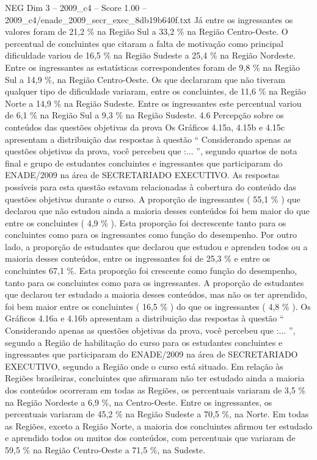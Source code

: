 \begin{textsample}{NEG Dim 3 – 2009\_c4 – Score 1.00 – 2009\_c4/enade\_2009\_secr\_exec\_8db19b640f.txt}
Já entre os ingressantes os valores foram de 21,2 \% na Região Sul a 33,2 \% na Região Centro-Oeste.
O percentual de concluintes que citaram a falta de motivação como principal dificuldade variou de 16,5 \% na Região Sudeste a 25,4 \% na Região Nordeste.
Entre os ingressantes as estatísticas correspondentes foram de 9,8 \% na Região Sul a 14,9 \%, na Região Centro-Oeste.
Os que declararam que não tiveram qualquer tipo de dificuldade variaram, entre os concluintes, de 11,6 \% na Região Norte a 14,9 \% na Região Sudeste.
Entre os ingressantes este percentual variou de 6,1 \% na Região Sul a 9,3 \% na Região Sudeste. 4.6 Percepção sobre os conteúdos das questões objetivas da prova Os Gráficos 4.15a, 4.15b e 4.15c apresentam a distribuição das respostas à questão “ Considerando apenas as questões objetivas da prova, você percebeu que :... ”, segundo quartos de nota final e grupo de estudantes concluintes e ingressantes que participaram do ENADE/2009 na área de SECRETARIADO EXECUTIVO.
As respostas possíveis para esta questão estavam relacionadas à cobertura do conteúdo das questões objetivas durante o curso.
A proporção de ingressantes ( 55,1 \% ) que declarou que não estudou ainda a maioria desses conteúdos foi bem maior do que entre os concluintes ( 4,9 \% ).
Esta proporção foi decrescente tanto para os concluintes como para os ingressantes como função do desempenho.
Por outro lado, a proporção de estudantes que declarou que estudou e aprendeu todos ou a maioria desses conteúdos, entre os ingressantes foi de 25,3 \% e entre os concluintes 67,1 \%.
Esta proporção foi crescente como função do desempenho, tanto para os concluintes como para os ingressantes.
A proporção de estudantes que declarou ter estudado a maioria desses conteúdos, mas não os ter aprendido, foi bem maior entre os concluintes ( 16,5 \% ) do que os ingressantes ( 4,8 \% ).
Os Gráficos 4.16a e 4.16b apresentam a distribuição das respostas à questão “ Considerando apenas as questões objetivas da prova, você percebeu que :... ”, segundo a Região de habilitação do curso para os estudantes concluintes e ingressantes que participaram do ENADE/2009 na área de SECRETARIADO EXECUTIVO, segundo a Região onde o curso está situado.
Em relação às Regiões brasileiras, concluintes que afirmaram não ter estudado ainda a maioria dos conteúdos ocorreram em todas as Regiões, os percentuais variaram de 3,5 \% na Região Nordeste a 6,9 \%, na Centro-Oeste.
Entre os ingressantes, os percentuais variaram de 45,2 \% na Região Sudeste a 70,5 \%, na Norte.
Em todas as Regiões, exceto a Região Norte, a maioria dos concluintes afirmou ter estudado e aprendido todos ou muitos dos conteúdos, com percentuais que variaram de 59,5 \% na Região Centro-Oeste a 71,5 \%, na Sudeste.

\end{textsample}

